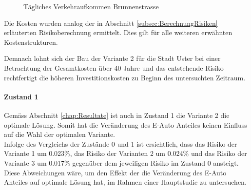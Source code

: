 \begin{figure}[h!]
  \centering
  \hfill
\caption[Verkehrsaufkommen]{Tägliches Verkehraufkommen Brunnenstrasse}
  \label{img:KostenZ0}
\end{figure}

\begin{IMleftrightskip}
Die Kosten wurden analog der in Abschnitt \ref{subsec:BerechnungRisiken} erläuterten Risikoberechnung ermittelt. Dies gilt für alle weiteren erwähnten Kostenstrukturen.
\end{IMleftrightskip}

Demnach lohnt sich der Bau der Variante 2 für die Stadt Uster bei einer Betrachtung der Gesamtkosten über 40 Jahre und das entstehende Risiko rechtfertigt die höheren Investitionskosten zu Beginn des untersuchten Zeitraum. 

\paragraph{Zustand 1}

Gemäss Abschnitt \ref{chap:Resultate} ist auch in Zustand 1 die Variante 2 die optimale Lösung. Somit hat die Veränderung des E-Auto Anteiles keinen Einfluss auf die Wahl der optimalen Variante. \\
Infolge des Vergleichs der Zustände 0 und 1 ist ersichtlich, dass das Risiko der Variante 1 um 0.023\%, das Risiko der Varianten 2 um 0.024\% und das Risiko der Variante 3 um 0.017\% gegenüber dem jeweiligen Risiko im Zustand 0 ansteigt. Diese Abweichungen wäre, um den Effekt der die Veränderung des E-Auto Anteiles auf optimale Lösung hat, im Rahmen einer Hauptstudie zu untersuchen.

